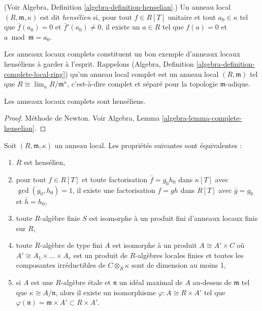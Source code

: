 \begin{definition}
\label{definition-henselian}
(Voir Algebra, Definition \ref{algebra-definition-henselian}.)
Un anneau local $(R, \mathfrak m, \kappa)$ est dit
{\it hens\'elien} si, pour tout
$f \in R[T]$ unitaire et tout $a_0 \in \kappa$ tel que
$\bar f(a_0) = 0$ et $\bar f'(a_0) \neq 0$, il existe
un $a \in R$ tel que $f(a) = 0$ et $a \bmod \mathfrak m = a_0$.
\end{definition}

\noindent
Les anneaux locaux complets constituent un bon exemple
d'anneaux locaux hens\'eliens \`a garder \`a l'esprit.
Rappelons
(Algebra, Definition \ref{algebra-definition-complete-local-ring})
qu'un anneau local complet est un anneau local $(R, \mathfrak m)$ tel que
$R \cong \lim_n R/\mathfrak m^n$, c'est-\`a-dire complet et s\'epar\'e
pour la topologie $\mathfrak m$-adique.

\begin{theorem}
\label{theorem-hensel}
Les anneaux locaux complets sont hens\'eliens.
\end{theorem}

\begin{proof}
M\'ethode de Newton. Voir
Algebra, Lemma \ref{algebra-lemma-complete-henselian}.
\end{proof}

\begin{theorem}
\label{theorem-henselian}
Soit $(R, \mathfrak m, \kappa)$ un anneau local. Les propri\'et\'es suivantes sont \'equivalentes :
\begin{enumerate}
\item $R$ est hens\'elien,
\item pour tout $f\in R[T]$ et toute factorisation $\bar f = g_0 h_0$ dans
$\kappa[T]$ avec $\gcd(g_0, h_0)=1$, il existe une factorisation $f = gh$ dans
$R[T]$ avec $\bar g = g_0$ et $\bar h = h_0$,
\item toute $R$-alg\`ebre finie $S$ est isomorphe \`a un produit fini
d'anneaux locaux finis sur $R$,
\item toute $R$-alg\`ebre de type fini $A$ est isomorphe \`a un produit
$A \cong A' \times C$ o\`u $A' \cong A_1 \times \ldots \times A_r$
est un produit de $R$-alg\`ebres locales finies et toutes les composantes
irr\'eductibles de $C \otimes_R \kappa$ sont de dimension au moins 1,
\item si $A$ est une $R$-alg\`ebre \'etale et $\mathfrak n$ un id\'eal maximal de
$A$ au-dessus de $\mathfrak m$ tel que $\kappa \cong A/\mathfrak n$, alors il
existe un isomorphisme $\varphi : A \cong R \times A'$ tel que
$\varphi(\mathfrak n) = \mathfrak m \times A' \subset R \times A'$.
\end{enumerate}
\end{theorem}

